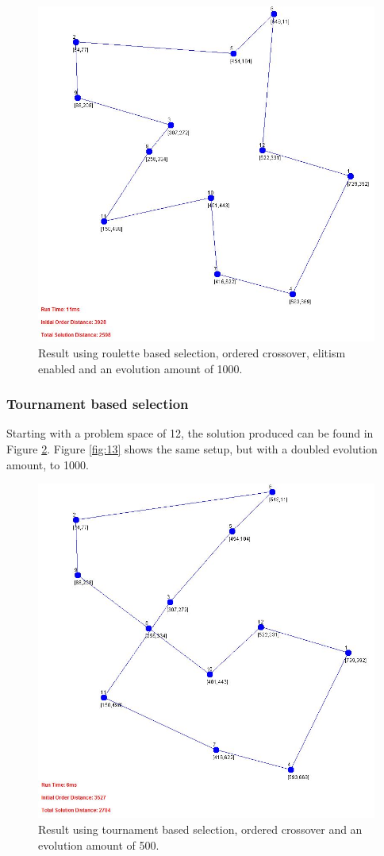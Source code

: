 \documentclass[article]{IEEEtran}
\begin{document}
\begin{figure}[H]
\centering
\includegraphics[width=.9\linewidth]{images/ordered_routlette_015_1000_true}
\caption{Result using roulette based selection, ordered crossover, elitism enabled and an evolution amount of 1000.}
\label{fig:11}
\end{figure}

\subsubsection{Tournament based selection}
Starting with a problem space of 12, the solution produced can be found in Figure \ref{fig:12}. Figure \ref{fig:13} shows the same setup, but with a doubled evolution amount, to 1000.
\begin{figure}[H]
\centering
\includegraphics[width=.9\linewidth]{images/ordered_tournament_015_500_false}
\caption{Result using tournament based selection, ordered crossover and an evolution amount of 500.}
\label{fig:12}
\end{figure}
\end{document}
